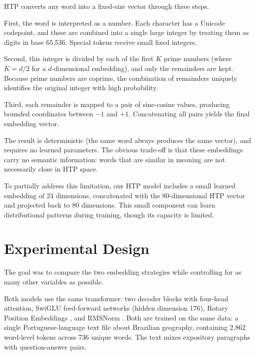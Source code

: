 \documentclass[10pt,twocolumn,a4paper]{article}
\newcommand{\htpname}{HTP}
\begin{document}
\htpname{} converts any word into a fixed-size vector through three steps.

First, the word is interpreted as a number. Each character has a Unicode codepoint, and these are combined into a single large integer by treating them as digits in base 65,536. Special tokens receive small fixed integers.

Second, this integer is divided by each of the first $K$ prime numbers (where $K = d/2$ for a $d$-dimensional embedding), and only the remainders are kept. Because prime numbers are coprime, the combination of remainders uniquely identifies the original integer with high probability.

Third, each remainder is mapped to a pair of sine-cosine values, producing bounded coordinates between $-1$ and $+1$. Concatenating all pairs yields the final embedding vector.

The result is deterministic (the same word always produces the same vector), and requires no learned parameters. The obvious trade-off is that these embeddings carry no semantic information: words that are similar in meaning are not necessarily close in \htpname{} space.

To partially address this limitation, our \htpname{} model includes a small learned embedding of 24 dimensions, concatenated with the 80-dimensional \htpname{} vector and projected back to 80 dimensions. This small component can learn distributional patterns during training, though its capacity is limited.

\section{Experimental Design}
\label{sec:experiment}

The goal was to compare the two embedding strategies while controlling for as many other variables as possible.

Both models use the same transformer: two decoder blocks with four-head attention, SwiGLU feed-forward networks (hidden dimension 176), Rotary Position Embeddings \cite{su2024roformer}, and RMSNorm \cite{zhang2019root}. Both are trained on the same data: a single Portuguese-language text file about Brazilian geography, containing 2,862 word-level tokens across 736 unique words. The text mixes expository paragraphs with question-answer pairs.
\end{document}
